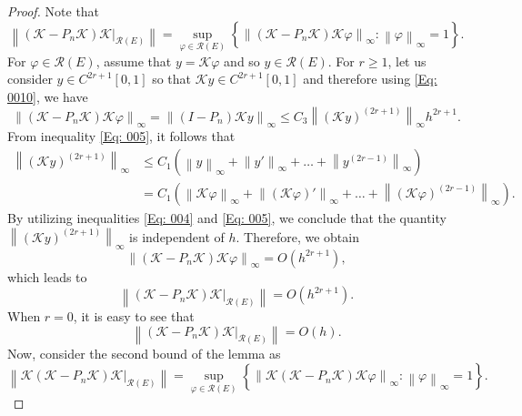\documentclass[pdflatex, sn-mathphys-num]{sn-jnl}%
\newcommand{\norm}[1]{\left\lVert #1\right\rVert}
\theoremstyle{thmstyleone}%
\theoremstyle{thmstyletwo}%
\theoremstyle{thmstylethree}%
\begin{document}
\begin{proof} Note that 	
	\begin{equation*}
		\norm{(\mathcal{K} - P_n \mathcal{K}) \mathcal{K} |_{\mathcal{R}(E)} } = \sup_{\varphi \in \mathcal{R}(E)}\left\{ \norm{(\mathcal{K} - P_n \mathcal{K}) \mathcal{K} \varphi }_\infty : \norm{\varphi}_\infty =1 \right\}.
	\end{equation*}
	For \(\varphi \in \mathcal{R}(E)\), assume that \(y= \mathcal{K}\varphi\) and so \(y \in \mathcal{R}(E)\). For \(r \geq 1\), let us consider \( y \in C^{2r+1}[0,1]\) so that \(\mathcal{K}y \in C^{2r+1}[0,1]\) and therefore using \eqref{Eq: 0010}, we have
	\begin{equation*}
		\norm{(\mathcal{K} - P_n \mathcal{K}) \mathcal{K} \varphi }_\infty = \norm{(I - P_n ) \mathcal{K} y }_\infty \leq C_3 \norm{\left(\mathcal{K}y\right)^{(2r+1)}}_\infty h^{2r+1}.
	\end{equation*}
	From inequality \eqref{Eq: 005}, it follows that  
	\begin{align*}
		\norm{\left(\mathcal{K}y\right)^{(2r+1)}}_\infty &\leq C_1 \left(\norm{y}_\infty + \norm{y'}_\infty + \ldots + \norm{y^{(2r-1)}}_\infty\right) \\  
		&= C_1 \left(\norm{\mathcal{K}\varphi}_\infty + \norm{(\mathcal{K}\varphi)'}_\infty + \ldots + \norm{(\mathcal{K}\varphi)^{(2r-1)}}_\infty\right).
	\end{align*}  
	By utilizing inequalities \eqref{Eq: 004} and \eqref{Eq: 005}, we conclude that the  quantity \( \norm{\left(\mathcal{K}y\right)^{(2r+1)}}_\infty \) is independent of \( h \). Therefore, we obtain 
	\begin{equation*}
		\norm{(\mathcal{K} - P_n \mathcal{K}) \mathcal{K} \varphi }_\infty = O\left(h^{2r+1}\right),
	\end{equation*}
	which leads to
	\begin{equation*}
		\norm{(\mathcal{K} - P_n \mathcal{K}) \mathcal{K} |_{\mathcal{R}(E)} } = 	O\left(h^{2r+1}\right).
	\end{equation*}
	When \(r = 0\), it is easy to see that 
	\begin{equation*}
		\norm{(\mathcal{K} - P_n \mathcal{K}) \mathcal{K} |_{\mathcal{R}(E)} } = O\left(h \right).
	\end{equation*}
	Now, consider the second bound of the lemma as
	\begin{equation*}
		\norm{ \mathcal{K} (\mathcal{K} - P_n \mathcal{K}) \mathcal{K} |_{\mathcal{R}(E)} } = \sup_{\varphi \in \mathcal{R}(E)}\left\{ \norm{\mathcal{K}(\mathcal{K} - P_n \mathcal{K}) \mathcal{K} \varphi }_\infty : \norm{\varphi}_\infty =1 \right\}.

\end{equation*}
\end{proof}
\end{document}
